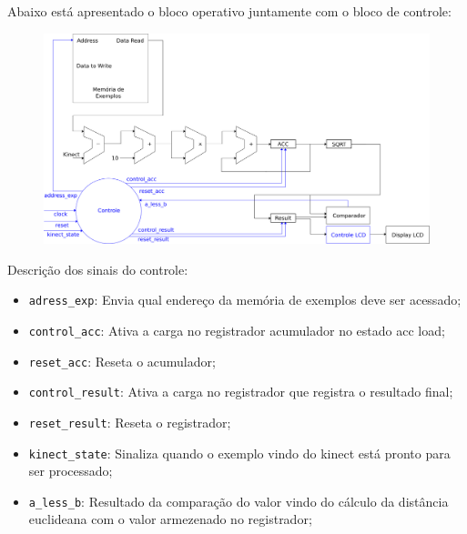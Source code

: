 Abaixo está apresentado o bloco operativo juntamente com o bloco de controle:

\begin{figure}[!h]
\centering
\includegraphics[scale=0.3]{img/circuito_knn.png}
\end{figure}

Descrição dos sinais do controle:

\begin{itemize}

\item \verb|adress_exp|:  Envia qual endereço da memória de exemplos deve ser acessado;
\item \verb|control_acc|: Ativa a carga no registrador acumulador no estado acc load;
\item \verb|reset_acc|: Reseta o acumulador;
\item \verb|control_result|: Ativa a carga no registrador que registra o resultado final;
\item \verb|reset_result|: Reseta o registrador;
\item \verb|kinect_state|: Sinaliza quando o exemplo vindo do kinect está pronto para ser processado;
\item \verb|a_less_b|: Resultado da comparação do valor vindo do cálculo da distância euclideana com o valor armezenado no registrador;
\end{itemize}